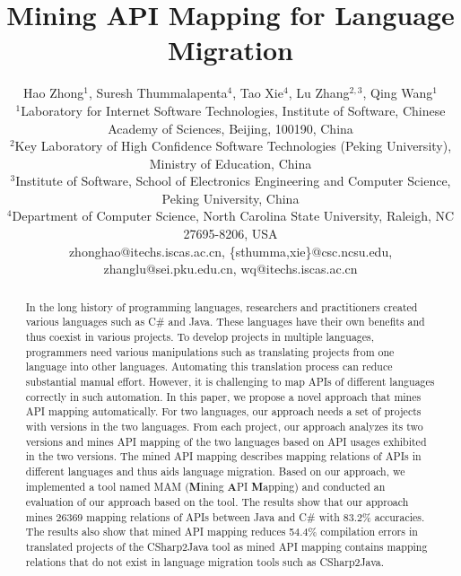 \documentclass{sig-alternate}
\begin{document}

\title{Mining API Mapping for Language Migration}

\author{
Hao Zhong$^{1}$, Suresh Thummalapenta$^4$, Tao Xie$^4$, Lu Zhang$^{2,3}$, Qing Wang$^{1}$\\
\small{$^1$Laboratory for Internet Software Technologies, Institute of Software, Chinese Academy of Sciences, Beijing, 100190, China}\\
\small{$^2$Key Laboratory of High Confidence Software Technologies (Peking University), Ministry of Education, China}\\
\small{$^3$Institute of Software, School of Electronics Engineering and Computer Science, Peking University, China} \\
\small{$^4$Department of Computer Science, North Carolina State University, Raleigh, NC 27695-8206, USA}\\
\small{zhonghao@itechs.iscas.ac.cn, \{sthumma,xie\}@csc.ncsu.edu,
zhanglu@sei.pku.edu.cn, wq@itechs.iscas.ac.cn}}

\maketitle
\thispagestyle{empty}

\begin{abstract}
In the long history of programming languages, researchers and
practitioners created various languages such as C\# and Java. These
languages have their own benefits and thus coexist in various
projects. To develop projects in multiple languages, programmers
need various manipulations such as translating projects from one
language into other languages. Automating this translation process
can reduce substantial manual effort. However, it is  challenging to
map APIs of different languages correctly in such automation. In
this paper, we propose a novel approach that mines API mapping
automatically. For two languages, our approach needs a set of
projects with versions in the two languages. From each project, our
approach analyzes its two versions and mines API mapping of the two
languages based on API usages exhibited in the two versions. The
mined API mapping describes mapping relations of APIs in different
languages and thus aids language migration. Based on our approach,
we implemented a tool named MAM (\textbf{M}ining \textbf{A}PI
\textbf{M}apping) and conducted an evaluation of our approach based
on the tool. The results show that our approach mines 26369 mapping
relations of APIs between Java and C\# with 83.2\% accuracies. The
results also show that mined API mapping reduces 54.4\% compilation
errors in translated projects of the CSharp2Java tool as mined API
mapping contains mapping relations that do not exist in language
migration tools such as CSharp2Java.
\end{abstract}
\end{document}
